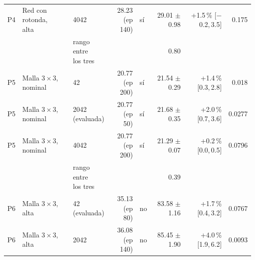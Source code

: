 \begin{table}[H]
\begin{tabular}{lllrlrrr}
P4 & \makecell[l]{Red con rotonda,\\{}alta} & 4042 & \makecell[r]{28.23\\{}(ep 140)} & sí & \makecell[r]{29.01\\{}$\pm$ 0.98} & \makecell[r]{+1.5\,\%\\{}[$-$0.2,\,3.5]} & 0.175 \\
 & & \makecell[l]{rango entre\\{}los tres} & & & 0.80 & & \\
P5 & \makecell[l]{Malla $3 \times 3$,\\{}nominal} & 42 & \makecell[r]{20.77\\{}(ep 200)} & sí & \makecell[r]{21.54\\{}$\pm$ 0.29} & \makecell[r]{+1.4\,\%\\{}[0.3,\,2.8]} & 0.018 \\
P5 & \makecell[l]{Malla $3 \times 3$,\\{}nominal} & \makecell[l]{2042\\{}(evaluada)} & \makecell[r]{20.77\\{}(ep 50)} & sí & \makecell[r]{21.68\\{}$\pm$ 0.35} & \makecell[r]{+2.0\,\%\\{}[0.7,\,3.6]} & 0.0277 \\
P5 & \makecell[l]{Malla $3 \times 3$,\\{}nominal} & 4042 & \makecell[r]{20.77\\{}(ep 200)} & sí & \makecell[r]{21.29\\{}$\pm$ 0.07} & \makecell[r]{+0.2\,\%\\{}[0.0,\,0.5]} & 0.0796 \\
 & & \makecell[l]{rango entre\\{}los tres} & & & 0.39 & & \\
P6 & \makecell[l]{Malla $3 \times 3$,\\{}alta} & \makecell[l]{42\\{}(evaluada)} & \makecell[r]{35.13\\{}(ep 80)} & no & \makecell[r]{83.58\\{}$\pm$ 1.16} & \makecell[r]{+1.7\,\%\\{}[0.4,\,3.2]} & 0.0767 \\
P6 & \makecell[l]{Malla $3 \times 3$,\\{}alta} & 2042 & \makecell[r]{36.08\\{}(ep 140)} & no & \makecell[r]{85.45\\{}$\pm$ 1.90} & \makecell[r]{+4.0\,\%\\{}[1.9,\,6.2]} & 0.0093 \\

\end{tabular}
\end{table}
